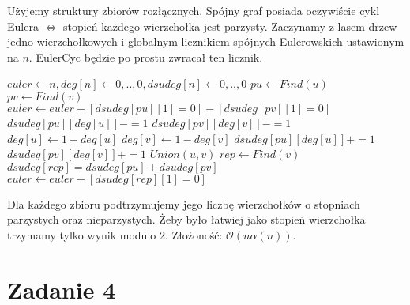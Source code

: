 \documentclass[12pt, a4paper]{article}
\newcommand{\MCALO}{\mathcal{O}}
\begin{document}
Użyjemy struktury zbiorów rozłącznych. Spójny graf posiada oczywiście cykl Eulera $\iff$ stopień
każdego wierzchołka jest parzysty. Zaczynamy z lasem drzew jedno-wierzchołkowych i globalnym licznikiem
spójnych Eulerowskich ustawionym na $n$. EulerCyc będzie po prostu zwracał ten licznik.
\begin{algorithmic}
\State $euler \gets n, deg[n] \gets {0,..,0}, dsudeg[n] \gets {0,..,0}$
\State $pu \gets Find(u)$
\State $pv \gets Find(v)$
\State $euler \gets euler - [dsudeg[pu][1] = 0] - [dsudeg[pv][1] = 0]$
\State $dsudeg[pu][deg[u]] -= 1$
\State $dsudeg[pv][deg[v]] -= 1$
\State $deg[u] \gets 1 - deg[u]$
\State $deg[v] \gets 1 - deg[v]$
\State $dsudeg[pu][deg[u]] += 1$
\State $dsudeg[pv][deg[v]] += 1$
\State $Union(u, v)$
\State $rep \gets Find(v)$
\State $dsudeg[rep] = dsudeg[pu] + dsudeg[pv]$
\State $euler \gets euler + [dsudeg[rep][1] = 0]$
\EndFunction
\end{algorithmic}
Dla każdego zbioru podtrzymujemy jego liczbę wierzchołków o stopniach parzystych oraz nieparzystych.
Żeby było łatwiej jako stopień wierzchołka trzymamy tylko wynik modulo $2$.
Złożoność: $\MCALO(n\alpha(n))$.

\section*{Zadanie 4}
\end{document}
